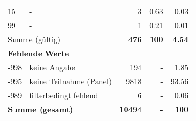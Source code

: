 \begin{longtable}{lXrrr}
     15 &
     \multicolumn{1}{X}{ -  } &


       \num{3} &
       \num[round-mode=places,round-precision=2]{0,63} &
         \num[round-mode=places,round-precision=2]{0,03} \\

     99 &
     \multicolumn{1}{X}{ -  } &


       \num{1} &
       \num[round-mode=places,round-precision=2]{0,21} &
         \num[round-mode=places,round-precision=2]{0,01} \\
     \midrule
     \multicolumn{2}{l}{Summe (gültig)} &
       \textbf{\num{476}} &
     \textbf{100} &
       \textbf{\num[round-mode=places,round-precision=2]{4,54}} \\
     \multicolumn{5}{l}{\textbf{Fehlende Werte}}\\
       -998 &
       keine Angabe &
         \num{194} &
        - &
         \num[round-mode=places,round-precision=2]{1,85} \\
       -995 &
       keine Teilnahme (Panel) &
         \num{9818} &
        - &
         \num[round-mode=places,round-precision=2]{93,56} \\
       -989 &
       filterbedingt fehlend &
         \num{6} &
        - &
         \num[round-mode=places,round-precision=2]{0,06} \\
     \midrule
     \multicolumn{2}{l}{\textbf{Summe (gesamt)}} &
          \textbf{\num{10494}} &
        \textbf{-} &
        \textbf{100} \\
     \bottomrule
     \end{longtable}
     
